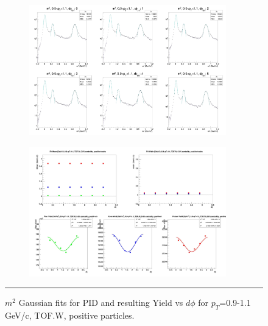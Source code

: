 \begin{figure}[H]
  \centering
    \begin{subfigure}[p]{1\textwidth}
   \centering
   \includegraphics[width=0.94\textwidth]{lowptfits/yieldvsdphi_tof1_cent0_ch1_pT-9-11.jpg}
    \end{subfigure}
    \begin{subfigure}[p]{1\textwidth}
   \centering
   \includegraphics[width=0.94\textwidth]{lowptfits/fitParams_tof1_cent0_ch1_pT-9-11.jpg}
    \end{subfigure}
    \rule{35em}{0.5pt}
  \caption[PID fits and Yield vs $d\phi$ for $p_T$=0.9-1.1 GeV/c, TOF.W, positive particles. ]{$m^2$ Gaussian fits for PID and resulting Yield vs $d\phi$ for $p_T$=0.9-1.1 GeV/c, TOF.W, positive particles.}
  \label{fig:fits9-11pos}
\end{figure}

